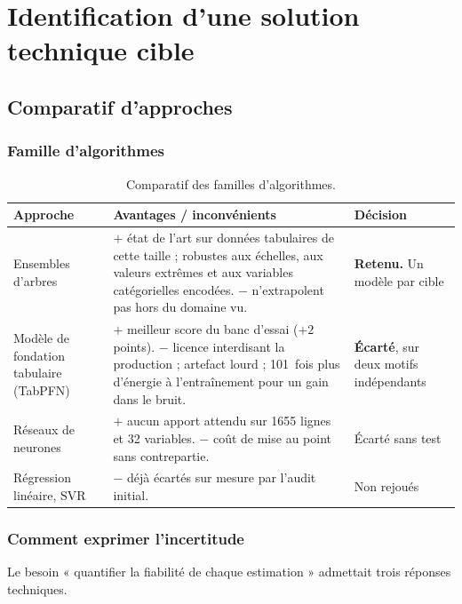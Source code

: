 \section{Identification d'une solution technique cible}

\subsection{Comparatif d'approches}

\subsubsection*{Famille d'algorithmes}

\begin{table}[H]
\centering
\small
\begin{tabularx}{\linewidth}{@{}L{3.2cm}XL{3.4cm}@{}}
\toprule
\textbf{Approche} & \textbf{Avantages / inconvénients} & \textbf{Décision} \\
\midrule
Ensembles d'arbres &
$+$ état de l'art sur données tabulaires de cette taille ; robustes aux échelles,
aux valeurs extrêmes et aux variables catégorielles encodées.
$-$ n'extrapolent pas hors du domaine vu. &
\textbf{Retenu.} Un modèle par cible \\
\addlinespace
Modèle de fondation tabulaire (TabPFN) &
$+$ meilleur score du banc d'essai ($+2$ points).
$-$ licence interdisant la production ; artefact lourd ; 101~fois plus d'énergie
à l'entraînement pour un gain dans le bruit. &
\textbf{Écarté}, sur deux motifs indépendants \\
\addlinespace
Réseaux de neurones &
$+$ aucun apport attendu sur \num{1655} lignes et 32 variables.
$-$ coût de mise au point sans contrepartie. &
Écarté sans test \\
\addlinespace
Régression linéaire, SVR &
$-$ déjà écartés sur mesure par l'audit initial. &
Non rejoués \\
\bottomrule
\end{tabularx}
\caption{Comparatif des familles d'algorithmes.}
\end{table}

\subsubsection*{Comment exprimer l'incertitude}

Le besoin « quantifier la fiabilité de chaque estimation » admettait trois
réponses techniques.

